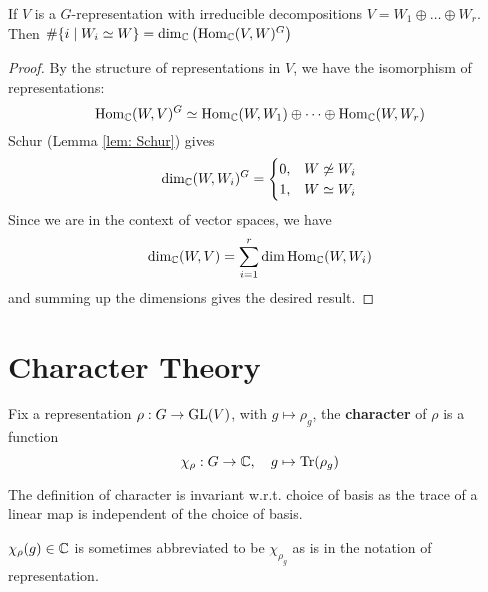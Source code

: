 \documentclass{article}
\begin{document}
\begin{corollary}
    If $V$ is a $G$-representation with irreducible decompositions $V = W_1 \oplus \dots \oplus W_r$. Then $\#\{ i \mid W_i \simeq W \} = \dim_{\mathbb{C}}\left( \mathrm{Hom}_{\mathbb{C}}(V, W)^G \right)$
\end{corollary}

\begin{proof}
    By the structure of representations in $V$, we have the isomorphism of representations:
    \[
        \mathrm{Hom}_{\mathbb{C}}(W, V)^G \simeq \mathrm{Hom}_{\mathbb{C}}(W, W_1) \oplus \dots \oplus \mathrm{Hom}_{\mathbb{C}}(W, W_r)
    \]
    Schur (Lemma \ref{lem: Schur}) gives 
    \[
        \dim_{\C}(W, W_i)^G = 
        \begin{cases}
            0, & W \nsimeq W_i \\
            1, & W \simeq W_i
        \end{cases}
    \]
    Since we are in the context of vector spaces, we have
    \[
        \dim_{\mathbb{C}}(W, V) = \sum_{i = 1}^r \dim \mathrm{Hom}_{\mathbb{C}} (W, W_i)
    \]
    and summing up the dimensions gives the desired result.
\end{proof}

\section{Character Theory}

\begin{definition}[Character]
    Fix a representation $\rho: G \to \mathrm{GL}(V)$, with $g \mapsto \rho_g$, the \textbf{character} of $\rho$ is a function
    \[
        \chi_{\rho}: G \to \mathbb{C}, \quad g \mapsto \mathrm{Tr}(\rho_g)
    \]
\end{definition}

\begin{remark}
    The definition of character is invariant w.r.t. choice of basis as the trace of a linear map is independent of the choice of basis. 
\end{remark}

\begin{notation}
    $\chi_{\rho}(g) \in \mathbb{C}$ is sometimes abbreviated to be $\chi_{\rho_g}$ as is in the notation of representation.
\end{notation}
\end{document}
